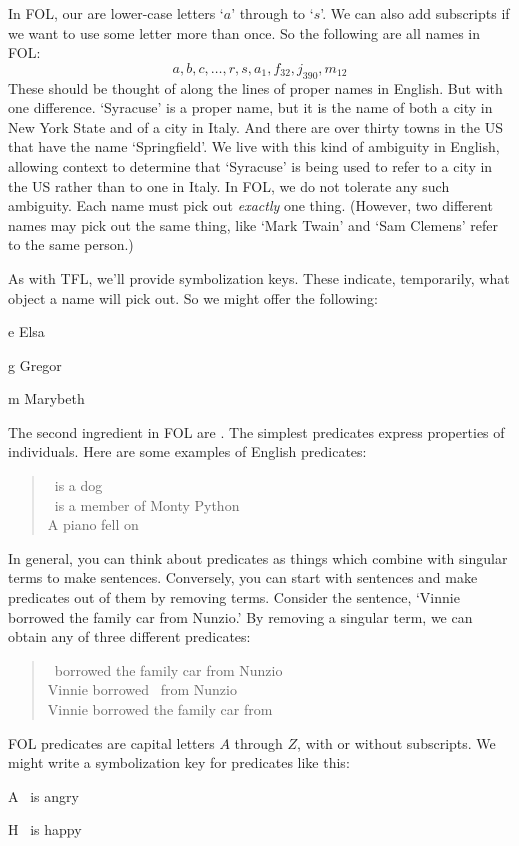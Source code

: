 In FOL, our  are lower-case letters `$a$' through to `$s$'. We can also add subscripts if we want to use some letter more than once. So the following are all names in FOL:
	$$a,b,c,\ldots, r, s, a_1, f_{32}, j_{390}, m_{12}$$
These should be thought of along the lines of proper names in English. But with one difference. `Syracuse' is a proper name, but it is the name of both a city in New York State and of a city in Italy.  And there are over thirty towns in the US that have the name `Springfield'.   We live with this kind of ambiguity in English, allowing context to determine that `Syracuse' is being used to refer to a city in the US rather than to one in Italy. In FOL, we do not tolerate any such ambiguity. Each name must pick out \emph{exactly} one thing. (However, two different names may pick out the same thing, like `Mark Twain' and `Sam Clemens' refer to the same person.)

As with TFL, we'll provide symbolization keys. These indicate, temporarily, what object a name will pick out. So we might offer the following:
	\begin{ekey}
		\item[e] Elsa
		\item[g] Gregor
		\item[m] Marybeth
	\end{ekey}

The second ingredient in FOL are .   The simplest predicates express properties of individuals. Here are some examples of English predicates:
	\begin{quote}
		\blank\ is a dog\\
		\blank\ is a member of Monty Python\\
		A piano fell on \blank
	\end{quote}
In general, you can think about predicates as things which combine with singular terms to make sentences. Conversely, you can start with sentences and make predicates out of them by removing terms. Consider the sentence, `Vinnie borrowed the family car from Nunzio.' By removing a singular term, we can obtain any of three different predicates:
	\begin{quote}
		\blank\ borrowed the family car from Nunzio\\
		Vinnie borrowed \blank\ from Nunzio\\
		Vinnie borrowed the family car from \blank
	\end{quote}
FOL predicates are capital letters $A$ through $Z$, with or without subscripts. We might write a symbolization key for predicates  like this:
	\begin{ekey}
		\item[A] \blank\ is angry
		\item[H] \blank\ is happy
	\end{ekey}

